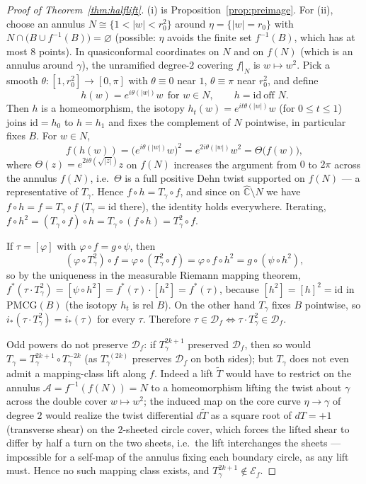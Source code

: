 \documentclass[11pt]{article}
\newcommand{\Ef}{\mathcal E_f}
\theoremstyle{definition}
\theoremstyle{remark}
\newcommand{\PMCG}{\mathrm{PMCG}}
\newcommand{\Chat}{\widehat{\mathbb C}}
\newcommand{\Df}{\mathcal D_f}
\begin{document}
\begin{proof}[Proof of Theorem~\ref{thm:halflift}]
(i) is Proposition~\ref{prop:preimage}.  For (ii), choose an annulus
$N\cong\{1<|w|<r_0^2\}$ around $\eta=\{|w|=r_0\}$ with
$N\cap\bigl(B\cup f^{-1}(B)\bigr)=\varnothing$ (possible: $\eta$
avoids the finite set $f^{-1}(B)$, which has at most $8$ points).
In quasiconformal coordinates on $N$ and on $f(N)$ (which is an
annulus around $\gamma$), the unramified degree-$2$ covering
$f|_N$ is $w\mapsto w^2$.  Pick a smooth
$\theta:[1,r_0^2]\to[0,\pi]$ with $\theta\equiv0$ near $1$,
$\theta\equiv\pi$ near $r_0^2$, and define
\[
h(w)=e^{i\theta(|w|)}w\ \ \text{for }w\in N,
\qquad h=\mathrm{id}\ \text{off }N.
\]
Then $h$ is a homeomorphism, the isotopy
$h_t(w)=e^{it\theta(|w|)}w$ (for $0\le t\le1$) joins
$\mathrm{id}=h_0$ to $h=h_1$ and fixes the complement of $N$
pointwise, in particular fixes $B$.  For $w\in N$,
\[
f(h(w))=\bigl(e^{i\theta(|w|)}w\bigr)^2=e^{2i\theta(|w|)}w^2
=\Theta\bigl(f(w)\bigr),
\]
where $\Theta(z)=e^{2i\theta(\sqrt{|z|})}z$ on $f(N)$ increases the
argument from $0$ to $2\pi$ across the annulus $f(N)$, i.e.\ $\Theta$
is a full positive Dehn twist supported on $f(N)$ — a representative of
$T_\gamma$.  Hence $f\circ h=T_\gamma\circ f$, and since on
$\Chat\setminus N$ we have $f\circ h=f=T_\gamma\circ f$
($T_\gamma=\mathrm{id}$ there), the identity holds everywhere.
Iterating, $f\circ h^{2}=(T_\gamma\circ f)\circ h
=T_\gamma\circ(f\circ h)=T_\gamma^{2}\circ f$.

If $\tau=[\varphi]$ with $\varphi\circ f=g\circ\psi$, then
\[
(\varphi\circ T_\gamma^{2})\circ f
=\varphi\circ(T_\gamma^{2}\circ f)
=\varphi\circ f\circ h^{2}
=g\circ(\psi\circ h^{2}),
\]
so by the uniqueness in the measurable Riemann mapping theorem,
$f^*(\tau\cdot T_\gamma^{2})=[\psi\circ h^{2}]
=f^*(\tau)\cdot[h^{2}]=f^*(\tau)$, because
$[h^2]=[h]^2=\mathrm{id}$ in $\PMCG(B)$ (the isotopy $h_t$ is rel
$B$).  On the other hand $T_\gamma$ fixes $B$ pointwise, so
$i_*(\tau\cdot T_\gamma^{2})=i_*(\tau)$ for every $\tau$.  Therefore
$\tau\in\Df\iff\tau\cdot T_\gamma^{2}\in\Df$.

Odd powers do not preserve $\Df$: if $T_\gamma^{2k+1}$ preserved
$\Df$, then so would $T_\gamma=T_\gamma^{2k+1}\circ T_\gamma^{-2k}$
(as $T_\gamma^{\circ(2k)}$ preserves $\Df$ on both sides); but
$T_\gamma$ does not even admit a mapping-class lift along $f$.  Indeed
a lift $\tilde T$ would have to restrict on the annulus
$\mathscr A=f^{-1}(f(N))=N$ to a homeomorphism lifting the twist
about $\gamma$ across the double cover $w\mapsto w^2$; the induced map
on the core curve $\eta\to\gamma$ of degree $2$ would realize the
twist differential $d\tilde T$ as a square root of $dT=+1$
(transverse shear) on the $2$-sheeted circle cover, which forces the
lifted shear to differ by half a turn on the two sheets, i.e.\ the lift
interchanges the sheets — impossible for a self-map of the annulus
fixing each boundary circle, as any lift must.  Hence no such mapping
class exists, and $T_\gamma^{2k+1}\notin\Ef$.
\end{proof}
\end{document}

